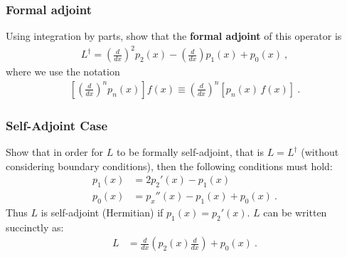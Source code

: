 \documentclass[12pt]{article}
\numberwithin{equation}{subsection}    %
\begin{document}
\subsubsection{Formal adjoint}
Using integration by parts, show that the \textbf{formal adjoint} of this operator is 
\begin{align}
	L^\dag = \left(\frac{d}{dx}\right)^2 p_2(x)
	- \left(\frac{d}{dx}\right)p_1(x)
	+ p_0(x) \ ,
\end{align}
where we use the notation 
\begin{align}
	\left[\left(\frac{d}{dx}\right)^n p_n(x)\right] f(x) \equiv 
		\left(\frac{d}{dx}\right)^n 
		\left[ p_n(x)\, f(x)\right] \ .
\end{align}

\subsubsection{Self-Adjoint Case}

Show that in order for $L$ to be formally self-adjoint, that is $L = L^\dag$ (without considering boundary conditions), then the following conditions must hold:
\begin{align}
	p_1(x) &= 2p_2'(x) - p_1(x) \\
	p_0(x) &= p_x''(x) - p_1(x) + p_0(x) \ .
\end{align}
Thus $L$ is self-adjoint (Hermitian) if $p_1(x) = p_2'(x)$. $L$ can be written succinctly as:
\begin{align}
	L &= \frac{d}{dx}
		\left(p_2(x)\frac{d}{dx}\right) + p_0(x) \ .
\end{align}
\end{document}
